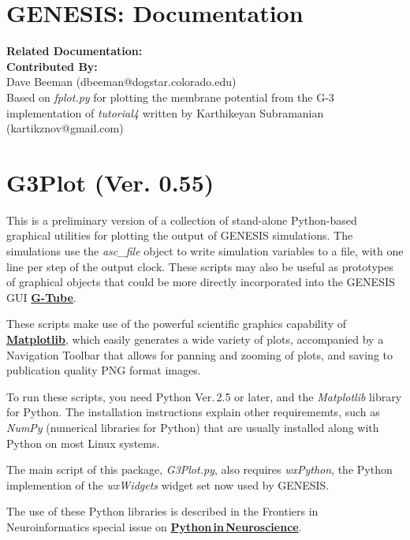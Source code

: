 \documentclass[12pt]{article}
\begin{document}
\section*{GENESIS: Documentation}

{\bf Related Documentation:}
{\\\bf Contributed By:}\\
Dave Beeman (dbeeman@dogstar.colorado.edu)\\
Based on {\it fplot.py} for plotting the membrane potential from the G-3 implementation of {\it tutorial4} written by Karthikeyan Subramanian (kartikznov@gmail.com)

\section*{G3Plot (Ver. 0.55)}

This is a preliminary version of a collection of stand-alone Python-based
graphical utilities for plotting the output of GENESIS simulations.  The
simulations use the {\it asc\_file} object to write simulation variables to a
file, with one line per step of the output clock.  These scripts may also
be useful as prototypes of graphical objects that could be more directly
incorporated into the GENESIS GUI \href{../gtube/gtube.tex}{\bf G-Tube}.

These scripts make use of the powerful
scientific graphics capability of \href{http://matplotlib.sourceforge.net/}{\bf Matplotlib}, which easily generates a
wide variety of plots, accompanied by a Navigation Toolbar that allows
for panning and zooming of plots, and saving to publication quality
PNG format images.

To run these scripts, you need Python Ver.\,2.5 or later,
and the {\it Matplotlib} library for Python.  
The installation instructions
explain other requirememts, such as {\it NumPy} (numerical libraries for Python)
that are usually installed along with Python on most Linux systems.

The main script of this package, {\it G3Plot.py}, also requires {\it wxPython}, the
Python implemention of the {\it wxWidgets} widget set now used by GENESIS.

The use of these Python libraries is described in the Frontiers in
Neuroinformatics special issue on \href{http://frontiersin.org/neuroscience/neuroinformatics/specialtopics/8/}{\bf Python\,in\,Neuroscience}.
\end{document}
